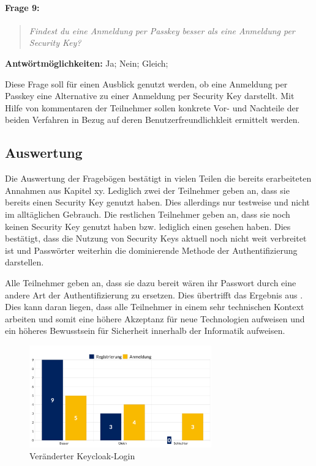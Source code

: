 \paragraph{Frage 9:}

\begin{quote}
    \textit{Findest du eine Anmeldung per Passkey besser als eine Anmeldung per Security Key?}
\end{quote}

\textbf{Antwörtmöglichkeiten:} Ja; Nein; Gleich;

Diese Frage soll für einen Ausblick genutzt werden, ob eine Anmeldung per Passkey eine Alternative zu einer Anmeldung per Security Key darstellt. Mit Hilfe von kommentaren der Teilnehmer sollen konkrete Vor- und Nachteile der beiden Verfahren in Bezug auf deren Benutzerfreundlichkleit ermittelt werden.


\subsection{Auswertung}
Die Auswertung der Fragebögen bestätigt in vielen Teilen die bereits erarbeiteten Annahmen aus Kapitel xy. Lediglich zwei der Teilnehmer geben an, dass sie bereits einen Security Key genutzt haben. Dies allerdings nur testweise und nicht im alltäglichen Gebrauch. Die restlichen Teilnehmer geben an, dass sie noch keinen Security Key genutzt haben bzw. lediglich einen gesehen haben. Dies bestätigt, dass die Nutzung von Security Keys aktuell noch nicht weit verbreitet ist und Passwörter weiterhin die dominierende Methode der Authentifizierung darstellen.

Alle Teilnehmer geben an, dass sie dazu bereit wären ihr Passwort durch eine andere Art der Authentifizierung zu ersetzen. Dies übertrifft das Ergebnis aus \cite{techstat}. Dies kann daran liegen, dass alle Teilnehmer in einem sehr technischen Kontext arbeiten und somit eine höhere Akzeptanz für neue Technologien aufweisen und ein höheres Bewusstsein für Sicherheit innerhalb der Informatik aufweisen. 

\begin{figure}[H]
	\centering 
	\includegraphics[width=0.7\textwidth]{img/abbildungen/chart_anmeldung_register.png}
	\captionsetup{format=hang}
	\caption{Veränderter Keycloak-Login}
\end{figure}

